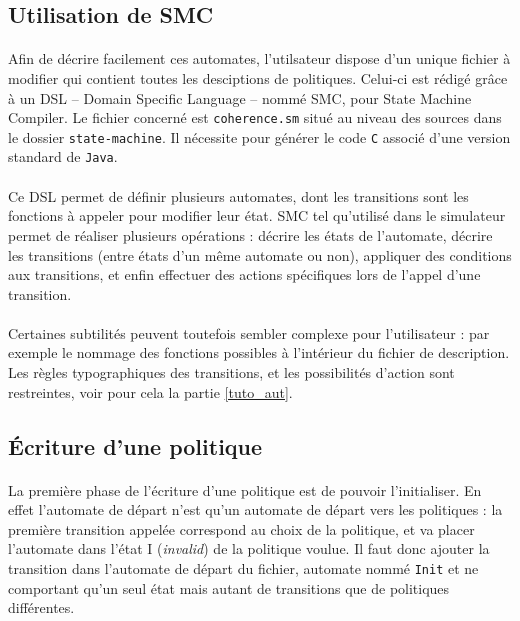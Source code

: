 \subsection{Utilisation de SMC}

\paragraph{}
Afin de décrire facilement ces automates, l'utilsateur dispose d'un unique fichier à modifier qui contient toutes les desciptions de politiques. Celui-ci est rédigé grâce à un DSL -- Domain Specific Language -- nommé \textsf{SMC}, pour State Machine Compiler. Le fichier concerné est \verb!coherence.sm! situé au niveau des sources dans le dossier \verb!state-machine!. Il nécessite pour générer le code \texttt{C} associé d'une version standard de \texttt{Java}.

\paragraph{}
Ce DSL permet de définir plusieurs automates, dont les transitions sont les fonctions à appeler pour modifier leur état. \textsf{SMC} tel qu'utilisé dans le simulateur permet de réaliser plusieurs opérations : décrire les états de l'automate, décrire les transitions (entre états d'un même automate ou non), appliquer des conditions aux transitions, et enfin effectuer des actions spécifiques lors de l'appel d'une transition.

\paragraph{}
Certaines subtilités peuvent toutefois sembler complexe pour l'utilisateur : par exemple le nommage des fonctions possibles à l'intérieur du fichier de description. Les règles typographiques des transitions, et les possibilités d'action sont restreintes, voir pour cela la partie \ref{tuto_aut}.

\subsection{\'Ecriture d'une politique}

\paragraph{}
La première phase de l'écriture d'une politique est de pouvoir l'initialiser. En effet l'automate de départ n'est qu'un automate de départ vers les politiques : la première transition appelée correspond au choix de la politique, et va placer l'automate dans l'état I (\emph{invalid}) de la politique voulue. Il faut donc ajouter la transition dans l'automate de départ du fichier, automate nommé \texttt{Init} et ne comportant qu'un seul état mais autant de transitions que de politiques différentes.

